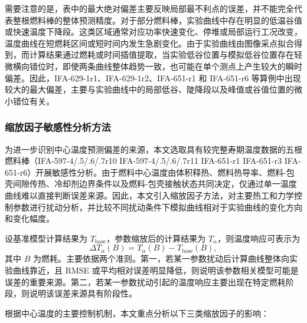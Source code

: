 需要注意的是，表中的最大绝对偏差主要反映局部最不利点的误差，并不能完全代表整根燃料棒的整体预测精度。对于部分燃料棒，实验曲线中存在明显的低温谷值或快速温度下降段。这类区域通常对应功率快速变化、停堆或局部运行工况改变，温度曲线在短燃耗区间或短时间内发生急剧变化。由于实验曲线由图像采点拟合得到，而计算结果通过燃耗或时间插值提取，当实验低谷位置与模拟低谷位置存在轻微横向错位时，即使两条曲线整体趋势一致，也可能在单个测点上产生较大的瞬时偏差。因此，IFA-629-1r1、IFA-629-1r2、IFA-651-r1 和 IFA-651-r6 等算例中出现较大的最大偏差，主要与实验曲线中的局部低谷、陡降段以及峰值或谷值位置的微小错位有关。

\subsubsection{缩放因子敏感性分析方法}
为进一步识别中心温度预测偏差的来源，本文选取具有较完整寿期温度数据的五根燃料棒（IFA-597-4/.5/.6/.7r10 IFA-597-4/.5/.6/.7r11 IFA-651-r1 IFA-651-r3 IFA-651-r6）开展敏感性分析。由于燃料中心温度由体积释热、燃料热导率、燃料-包壳间隙传热、冷却剂边界条件以及燃料-包壳接触状态共同决定，仅通过单一温度曲线难以直接判断误差来源。因此，本文引入缩放因子方法，对主要热工和力学控制参数进行扰动分析，并比较不同扰动条件下模拟曲线相对于实验曲线的变化方向和变化幅度。

设基准模型计算结果为 \(T_\mathrm{base}\)，参数缩放后的计算结果为 \(T_\alpha\)，则温度响应可表示为
\[
\Delta T_\alpha(B)
=
T_\alpha(B)-T_\mathrm{base}(B),
\]
其中 \(B\) 为燃耗。主要依据两个准则。第一，若某一参数扰动后计算曲线整体向实验曲线靠近，且 RMSE 或平均相对误差明显降低，则说明该参数相关模型可能是误差的重要来源。第二，若某一参数扰动引起的温度响应主要出现在特定燃耗阶段，则说明该误差来源具有阶段性。


根据中心温度的主要控制机制，本文重点分析以下三类缩放因子的影响：

